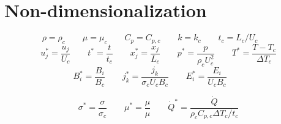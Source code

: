 \documentclass[11pt]{article}
\begin{document}
\section{Non-dimensionalization}
\begin{equation}
	\rho = \rho_c \qquad
	\mu = \mu_c \qquad
	C_p = C_{p,c} \qquad
	k = k_c \qquad
	t_c = L_c/U_c \qquad
\end{equation}
\begin{equation}
	u_j^* = \frac{u_j}{U_c} \qquad
	t^* = \frac{t}{t_c} \qquad
	x_j^* = \frac{x_j}{L_c} \qquad
	p^* = \frac{p}{\rho_c U_c^2} \qquad
	T^* = \frac{T - T_c}{\Delta T_c}
\end{equation}
\begin{equation}
	B_i^* = \frac{B_i}{B_c}  \qquad
	j_k^* = \frac{j_k}{\sigma_c U_c B_c} \qquad
	E_i^* = \frac{E_i}{U_c B_c} \qquad
\end{equation}

\begin{equation}
	\sigma^* = \frac{\sigma}{\sigma_c} \qquad
	\mu^* = \frac{\mu}{\mu} \qquad
	\dot{Q}^* = \frac{\dot{Q}}{\rho_c C_{p,c} \Delta T_c / t_c}
\end{equation}
\end{document}
